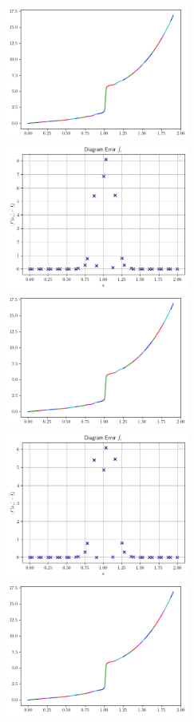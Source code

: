 \begin{figure}[H]
    \centering
    \includegraphics[width=6cm]{Images/figure_2/grafikOFB2n.png}
    \includegraphics[width=6cm]{Images/figure_2/plotOFB2n.png}
    \\
    \includegraphics[width=6cm]{Images/figure_2/grafikOAY2n.png}
    \includegraphics[width=6cm]{Images/figure_2/plotOAY2n.png}
    \\
    \includegraphics[width=6cm]{Images/figure_2/grafikRFB2n.png}

\end{figure}
